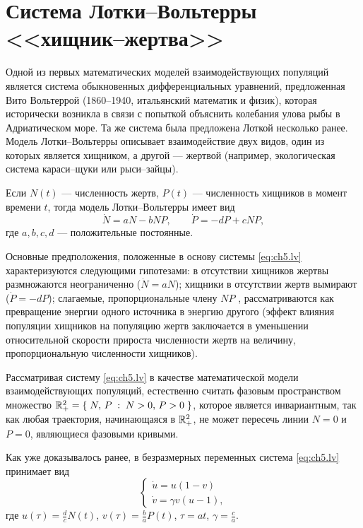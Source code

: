 \section{Система Лотки--Вольтерры <<хищник–жертва>>}

Одной из первых математических моделей взаимодействующих популяций является система обыкновенных дифференциальных уравнений, предложенная Вито Вольтеррой (1860–1940, итальянский математик и физик), которая исторически возникла в связи с попыткой объяснить колебания улова рыбы в Адриатическом море. Та же система была предложена Лоткой несколько ранее. Модель Лотки--Вольтерры описывает взаимодействие двух видов, один из
которых является хищником, а другой --- жертвой (например, экологическая система караси--щуки или рыси--зайцы).

Если $N(t)$ --- численность жертв, $P(t)$ --- численность хищников в момент времени $t$, тогда модель Лотки--Вольтерры имеет вид
\begin{equation}\label{eq:ch5.lv}
        \dot N = aN - bNP,
        \qquad
        \dot P = -dP + cNP,
\end{equation}
где $a,b,c,d$ --- положительные постоянные.

Основные предположения, положенные в основу системы \eqref{eq:ch5.lv} характеризуются следующими гипотезами: в отсутствии хищников жертвы размножаются неограниченно ($\dot N = aN$); хищники в отсутствии жертв вымирают ($\dot P = -dP$); слагаемые, пропорциональные члену $NP$ , рассматриваются как превращение энергии одного источника в энергию другого (эффект влияния популяции хищников на популяцию жертв
заключается в уменьшении относительной скорости прироста численности жертв на
величину, пропорциональную численности хищников).

Рассматривая систему \eqref{eq:ch5.lv} в качестве математической модели взаимодействующих популяций, естественно считать фазовым пространством множество $\mathbb{R}^2_+ =
\{\;N,\,P\;:\;N > 0,\,P > 0\;\}$, которое является инвариантным, так как любая траектория, начинающаяся в $\mathbb{R}^2_+$, не может пересечь линии $N = 0$ и $P = 0$, являющиеся фазовыми кривыми.

Как уже доказывалось ранее, в безразмерных переменных система \eqref{eq:ch5.lv} принимает вид
\begin{equation}\label{eq:ch5.easylv}
        \begin{cases}
\dot u = u(1-v) \\
\dot v = \gamma v (u - 1),
        \end{cases}
\end{equation}
где $u(\tau) = \frac{d}{c}N(t)$, $v(\tau) = \frac{b}{a}P(t)$, $\tau = at$, $\gamma = \frac{c}{a}$.

